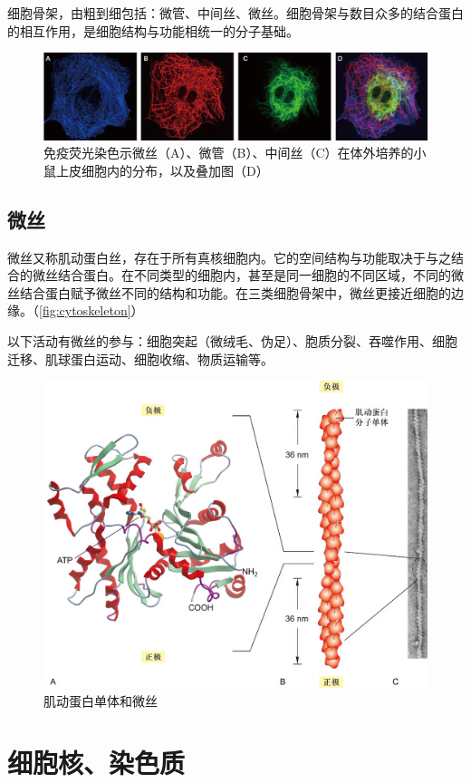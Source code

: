 细胞骨架，由粗到细包括：微管、中间丝、微丝。细胞骨架与数目众多的结合蛋白的相互作用，是细胞结构与功能相统一的分子基础。

\begin{figure}[h]
	\centering
	\includegraphics[width=0.9\linewidth]{Pics/cytoskeleton}
	\caption{免疫荧光染色示微丝（A）、微管（B）、中间丝（C）在体外培养的小鼠上皮细胞内的分布，以及叠加图（D）}
	\label{fig:cytoskeleton}
\end{figure}


\subsection{微丝}

微丝又称肌动蛋白丝，存在于所有真核细胞内。它的空间结构与功能取决于与之结合的微丝结合蛋白。在不同类型的细胞内，甚至是同一细胞的不同区域，不同的微丝结合蛋白赋予微丝不同的结构和功能。在三类细胞骨架中，微丝更接近细胞的边缘。（\autoref{fig:cytoskeleton}）

以下活动有微丝的参与：细胞突起（微绒毛、伪足）、胞质分裂、吞噬作用、细胞迁移、肌球蛋白运动、细胞收缩、物质运输等。

\begin{figure}
	\centering
	\includegraphics[width=0.7\linewidth]{Pics/肌动蛋白和微丝}
	\caption{肌动蛋白单体和微丝}
	\label{fig:actin_microfibre}
\end{figure}


\section{细胞核、染色质}


